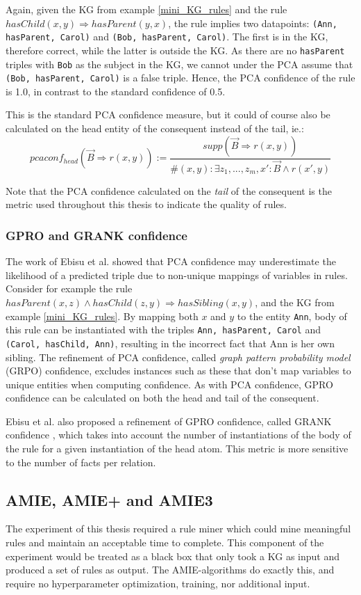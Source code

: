 Again, given the KG from example \ref{mini_KG_rules} and the rule $hasChild(x, y) \Rightarrow hasParent(y, x)$, the rule implies two datapoints: \texttt{(Ann, hasParent, Carol)} and \texttt{(Bob, hasParent, Carol)}. The first is in the KG, therefore correct, while the latter is outside the KG. As there are no \texttt{hasParent} triples with \texttt{Bob} as the subject in the KG, we cannot under the PCA assume that \texttt{(Bob, hasParent, Carol)} is a false triple. Hence, the PCA confidence of the rule is 1.0, in contrast to the standard confidence of 0.5.

This is the standard PCA confidence measure, but it could of course also be calculated on the head entity of the consequent instead of the tail, ie.: 
\[pcaconf_{head}(\vec{B}\Rightarrow r(x, y)) := \frac{supp(\vec{B}\Rightarrow r(x, y))}{\#(x, y):\exists z_1 ,..., z_m, x' : \vec{B} \wedge r(x', y)}\]

Note that the PCA confidence calculated on the \textit{tail} of the consequent is the metric used throughout this thesis to indicate the quality of rules.

\subsubsection{GPRO and GRANK confidence}
The work of Ebisu et al. \cite{gpro} showed that PCA confidence may underestimate the likelihood of a predicted triple due to non-unique mappings of variables in rules. Consider for example the rule $hasParent(x, z) \wedge hasChild(z, y) \Rightarrow hasSibling(x, y)$, and the KG from example \ref{mini_KG_rules}. By mapping both $x$ and $y$ to the entity \texttt{Ann}, body of this rule can be instantiated with the triples \texttt{Ann, hasParent, Carol} and \texttt{(Carol, hasChild, Ann)}, resulting in the incorrect fact that Ann is her own sibling. The refinement of PCA confidence, called \textit{graph pattern probability model} (GRPO) confidence, excludes instances such as these that don't map variables to unique entities when computing confidence. As with PCA confidence, GPRO confidence can be calculated on both the head and tail of the consequent.

Ebisu et al. also proposed a refinement of GPRO confidence, called GRANK confidence \cite{gpro}, which takes into account the number of instantiations of the body of the rule for a given instantiation of the head atom. This metric is more sensitive to the number of facts per relation.


\subsection{AMIE, AMIE+ and AMIE3}
\label{the_amies}
The experiment of this thesis required a rule miner which could mine meaningful rules and maintain an acceptable time to complete. This component of the experiment would be treated as a black box that only took a KG as input and produced a set of rules as output. The AMIE-algorithms do exactly this, and require no hyperparameter optimization, training, nor additional input.

